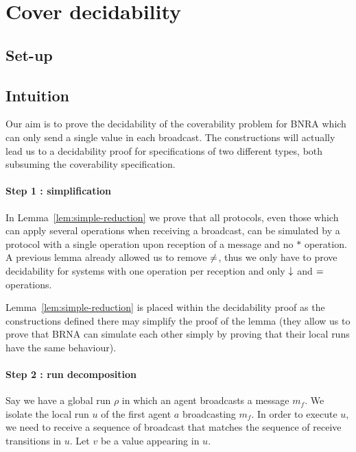 \section{Cover decidability}

\subsection{Set-up}

\ifintuition
\subsection{Intuition}

Our aim is to prove the decidability of the coverability problem for BNRA which can only send a single value in each broadcast. The constructions will actually lead us to a decidability proof for specifications of two different types, both subsuming the coverability specification.

\paragraph*{Step 1 : simplification} In Lemma~\ref{lem:simple-reduction} we prove that all protocols, even those which can apply several operations when receiving a broadcast, can be simulated by a protocol with a single operation upon reception of a message and no $*$ operation. A previous lemma already allowed us to remove ${\ne}$, thus we only have to prove decidability for systems with one operation per reception and only $\downarrow$ and ${=}$ operations.

Lemma~\ref{lem:simple-reduction} is placed within the decidability proof as the constructions defined there may simplify the proof of the lemma (they allow us to prove that BRNA can simulate each other simply by proving that their local runs have the same behaviour).

\paragraph*{Step 2 : run decomposition} Say we have a global run $\rho$ in which an agent broadcasts a message $m_f$. We isolate the local run $u$ of the first agent $a$ broadcasting $m_f$.
In order to execute $u$, we need to receive a sequence of broadcast that matches the sequence of receive transitions in $u$. Let $v$ be a value appearing in $u$.

